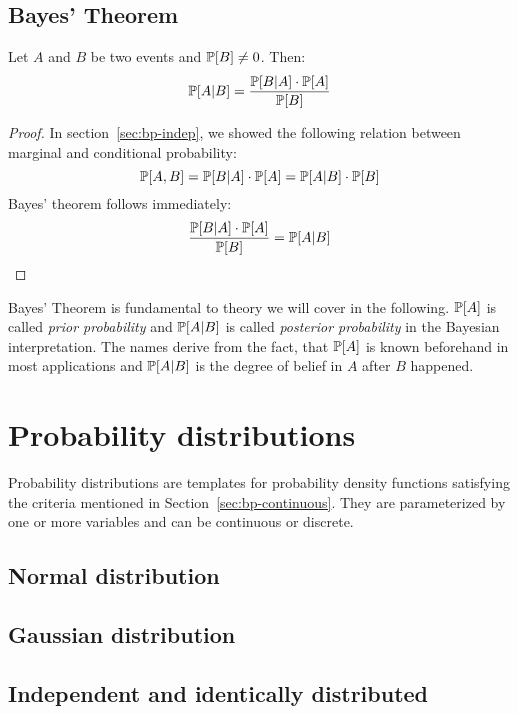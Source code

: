 
\subsection{Bayes' Theorem}
\label{sec:bp-bayes}
%
\begin{theorem}
  Let $A$ and $B$ be two events and $\mathbb P[B] \neq 0$. Then:
  \[ \mathbb P[A|B] = \frac{\mathbb P[B|A] \cdot \mathbb P[A]}{\mathbb P[B]} \]
\end{theorem}
\begin{proof}
  In section~\ref{sec:bp-indep}, we showed the following relation between marginal and conditional probability:
  \[ \mathbb P[A,B] = \mathbb P[B|A] \cdot \mathbb P[A] = \mathbb P[A|B] \cdot \mathbb P[B] \]
  Bayes' theorem follows immediately:
  \[ \frac{\mathbb P[B|A] \cdot \mathbb P[A]}{\mathbb P[B]} = \mathbb P[A|B] \]
\end{proof}

Bayes' Theorem is fundamental to theory we will cover in the following.
$\mathbb P[A]$ is called \emph{prior probability} and $\mathbb P[A|B]$ is called \emph{posterior probability} in the Bayesian interpretation.
The names derive from the fact, that $\mathbb P[A]$ is known beforehand in most applications and $\mathbb P[A|B]$ is the degree of belief in $A$ after $B$ happened.

\section{Probability distributions}
\label{sec:bp-dist}
%
Probability distributions are templates for probability density functions
satisfying the criteria mentioned in Section~\ref{sec:bp-continuous}.
They are parameterized by one or more variables and can be continuous or discrete.

\subsection{Normal distribution}
\label{sec:bp-norm-dist}
%

\subsection{Gaussian distribution}
\label{sec:bp-gaussian-dist}
%

\subsection{Independent and identically distributed}
\label{sec:bp-iid}
%

